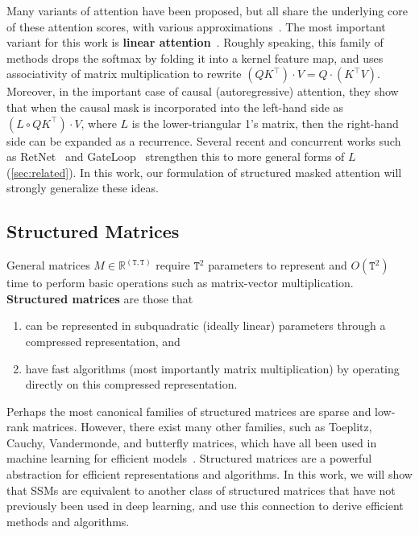 \documentclass{article}
\newcommand{\citep}{\parencite}
\newcommand{\R}{\mathbb{R}}
\begin{document}
Many variants of attention have been proposed, but all share the underlying core of these attention scores, with various approximations~\citep{tay2022efficient}.
The most important variant for this work is \textbf{linear attention}~\citep{katharopoulos2020transformers}.
Roughly speaking, this family of methods drops the softmax by folding it into a kernel feature map, and uses associativity of matrix multiplication to rewrite
$(QK^{\top}) \cdot V = Q \cdot (K^{\top} V)$.
Moreover, in the important case of causal (autoregressive) attention,
they show that when the causal mask is incorporated into the left-hand side as
$(L \circ QK^{\top}) \cdot V$, where $L$ is the lower-triangular 1's matrix,
then the right-hand side can be expanded as a recurrence.
Several recent and concurrent works
such as RetNet~\citep{sun2023retentive} and GateLoop~\citep{katsch2023gateloop} strengthen this to more general forms of $L$ (\cref{sec:related}).
In this work, our formulation of structured masked attention will strongly generalize these ideas.

\subsection{Structured Matrices}
\label{sec:overview:structured-matrix}

General matrices $M \in \R^{\mathtt{(T,T)}}$ require $\mathtt{T}^2$ parameters to represent and $O(\mathtt{T}^2)$ time to perform basic operations such as matrix-vector multiplication.
\textbf{Structured matrices} are those that
\begin{enumerate}[label=(\roman*)]
  \item can be represented in subquadratic (ideally linear) parameters through a compressed representation, and
  \item have fast algorithms (most importantly matrix multiplication) by operating directly on this compressed representation.
\end{enumerate}
Perhaps the most canonical families of structured matrices are sparse and low-rank matrices.
However, there exist many other families, such as Toeplitz, Cauchy, Vandermonde, and butterfly matrices, which have all been used in machine learning for efficient models~\citep{thomas2018learning,dao2019learning,gu2022parameterization,fu2024monarch}.
Structured matrices are a powerful abstraction for efficient representations and algorithms.
In this work, we will show that SSMs are equivalent to another class of structured matrices that have not previously been used in deep learning, and use this connection to derive efficient methods and algorithms.
\end{document}
